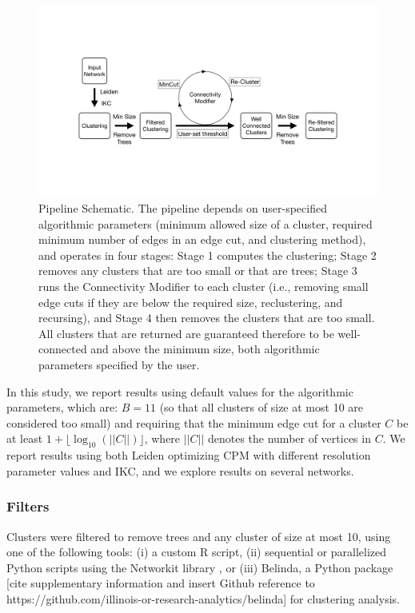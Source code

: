 \documentclass[a4paper]{article}   	%
\begin{document}
\begin{figure}[H]
\centering
\includegraphics[width=0.8\linewidth]{figs/workflow.pdf}
\caption{Pipeline Schematic. The pipeline depends on user-specified algorithmic parameters (minimum allowed size of a cluster, required minimum number of edges in an edge cut, and clustering method), and operates in four stages:  Stage 1 computes the clustering; Stage 2 removes any clusters that are too small or that are trees;  Stage 3 runs the  Connectivity Modifier to each cluster (i.e., removing small edge cuts if they are below the required size, reclustering, and recursing),  and Stage 4 then removes the clusters that are too small. All clusters that are returned are guaranteed therefore to be well-connected and above the minimum size, both algorithmic parameters specified by the user. }
\end{figure}




In this study, we report results using default values for the algorithmic parameters, which are: $B=11$ (so that all clusters of size at most 10 are considered too small) and requiring that the minimum edge cut for a cluster $C$ be at least  $ 1+ \lfloor \log_{10}(||C||) \rfloor$,  where $||C||$ denotes the number of vertices in $C$.
We report results using both Leiden optimizing CPM with different resolution parameter values and IKC, and we explore results on several networks.


\subsubsection{Filters} Clusters were filtered to remove trees and any cluster of size at most 10, using one of the following tools: (i) a custom R script, (ii) sequential or parallelized Python scripts using the Networkit library \citep{Staudt2016}, or (iii) Belinda, a Python package [cite supplementary information and insert Github reference to https://github.com/illinois-or-research-analytics/belinda] for clustering analysis.
\end{document}
